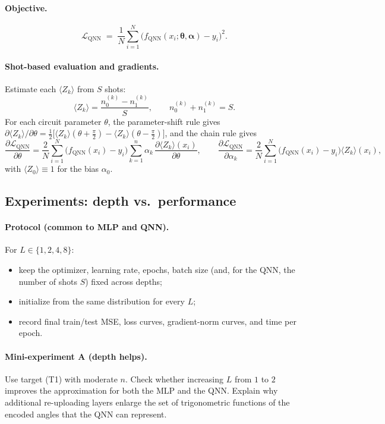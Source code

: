 \documentclass[11pt]{article}
\begin{document}
\paragraph{Objective.}
\[
\mathcal{L}_{\text{QNN}}
\;=\;
\frac{1}{N}\sum_{i=1}^{N}
\big(f_{\mathrm{QNN}}(x_i;\boldsymbol{\theta},\boldsymbol{\alpha}) - y_i\big)^2.
\]

\paragraph{Shot-based evaluation and gradients.}
Estimate each $\langle Z_k\rangle$ from $S$ shots:
\[
\widehat{\langle Z_k\rangle}
=
\frac{n^{(k)}_0 - n^{(k)}_1}{S},
\qquad
n^{(k)}_0 + n^{(k)}_1 = S.
\]
For each circuit parameter $\theta$, the parameter-shift rule gives $\partial\langle Z_k\rangle/\partial\theta=\tfrac12\big[\langle Z_k\rangle(\theta+\tfrac{\pi}{2})-\langle Z_k\rangle(\theta-\tfrac{\pi}{2})\big]$, and the chain rule gives
\[
\frac{\partial \mathcal{L}_{\text{QNN}}}{\partial \theta}
=
\frac{2}{N}\sum_{i=1}^{N}\big(f_{\mathrm{QNN}}(x_i)-y_i\big)\sum_{k=1}^{n}\alpha_k\,\frac{\partial \langle Z_k\rangle(x_i)}{\partial \theta},
\qquad
\frac{\partial \mathcal{L}_{\text{QNN}}}{\partial \alpha_k}
=
\frac{2}{N}\sum_{i=1}^{N}\big(f_{\mathrm{QNN}}(x_i)-y_i\big)\langle Z_k\rangle(x_i),
\]
with $\langle Z_0\rangle\equiv1$ for the bias $\alpha_0$.

\subsection*{Experiments: depth vs.\ performance}

\paragraph{Protocol (common to MLP and QNN).}
For $L\in\{1,2,4,8\}$:
\begin{itemize}
\item keep the optimizer, learning rate, epochs, batch size (and, for the QNN, the number of shots $S$) fixed across depths;
\item initialize from the same distribution for every $L$;
\item record final train/test MSE, loss curves, gradient-norm curves, and time per epoch.
\end{itemize}

\paragraph{Mini-experiment A (depth helps).}
Use target (T1) with moderate $n$.
Check whether increasing $L$ from $1$ to $2$ improves the approximation for both the MLP and the QNN.
Explain why additional re-uploading layers enlarge the set of trigonometric functions of the encoded angles that the QNN can represent.
\end{document}
